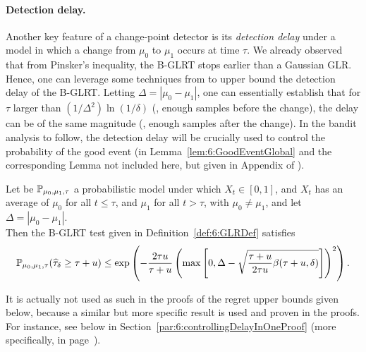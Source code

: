 \paragraph{Detection delay.}
%
Another key feature of a change-point detector is its \emph{detection delay} under a model in which a change from $\mu_0$ to $\mu_1$ occurs at time $\tau$. We already observed that from Pinsker's inequality, the B-GLRT stops earlier than a Gaussian GLR. Hence, one can leverage some techniques from \cite{Maillard2018GLR} to upper bound the detection delay of the B-GLRT. Letting $\Delta = |\mu_0 - \mu_1|$, one can essentially establish that for $\tau$ larger than $(1/\Delta^2)\ln(1/\delta)$ (\ie, enough samples before the change), the delay can be of the same magnitude (\ie, enough samples after the change).
In the bandit analysis to follow, the detection delay will be crucially used to control the probability of the good event (in Lemma~\ref{lem:6:GoodEventGlobal} and the corresponding Lemma not included here, but given in Appendix of \cite{Besson2019GLRT}).

\begin{lemma}\label{lem:6:Delay}
\begin{leftbar}[lemmabar]  %
    Let be $\mathbb{P}_{\mu_0,\mu_1,\tau}$ a probabilistic model under which $X_t \in [0,1]$, and $X_t$ has an average of $\mu_0$ for all $t \leq \tau$, and $\mu_1$ for all $t > \tau$, with $\mu_0 \neq \mu_1$,
    and let $\Delta = |\mu_0 - \mu_1|$.\\
    Then the B-GLRT test given in Definition~\ref{def:6:GLRDef} satisfies
    \begin{equation}
        \mathbb{P}_{\mu_0,\mu_1,\tau} (\widehat{\tau}_{\delta} \geq \tau + u) \leq \exp\left( -\frac{2\tau u}{\tau + u}\left(\max\left[ 0, \Delta - \sqrt{\frac{\tau + u}{2\tau u} \beta(\tau + u,\delta)} \right]\right)^2 \right).
    \end{equation}
\end{leftbar}  %
\end{lemma}
%
\begin{smallproof}
    It is actually not used as such in the proofs of the regret upper bounds given below, because a similar but more specific result is used and proven in the proofs.
    For instance, see below in Section~\ref{par:6:controllingDelayInOneProof} (more specifically, in page~\pageref{par:6:controllingDelayInOneProof}).
\end{smallproof}

